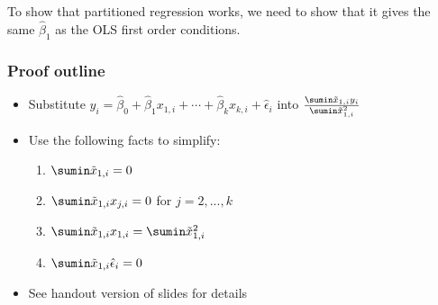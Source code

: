 To show that partitioned regression works, we need to show that it
gives the same $\hat{\beta}_1$ as the OLS first order conditions. 

\begin{frame}\frametitle{Proof outline}
  \begin{itemize}
  \item Substitute $y_i = \hat{\beta}_0 + \hat{\beta}_1 x_{1,i} +
    \cdots + \hat{\beta}_k x_{k,i} + \hat{\epsilon}_i$ into
    $\frac{\sumin \tilde{x}_{1,i} y_i}{\sumin
      \tilde{x}_{1,i}^2}$ 
  \item Use the following facts to simplify:
    \begin{enumerate}
    \item $\sumin \tilde{x}_{1,i} = 0 $
    \item $\sumin \tilde{x}_{1,i} x_{j,i} = 0$ for $j=2,...,k$
    \item $\sumin \tilde{x}_{1,i} x_{1,i} = \sumin \tilde{x}_{1,i}^2$
    \item $\sumin \tilde{x}_{1,i} \hat{\epsilon}_i = 0$
    \end{enumerate}
  \item See handout version of slides for details
  \end{itemize}

\end{frame}

